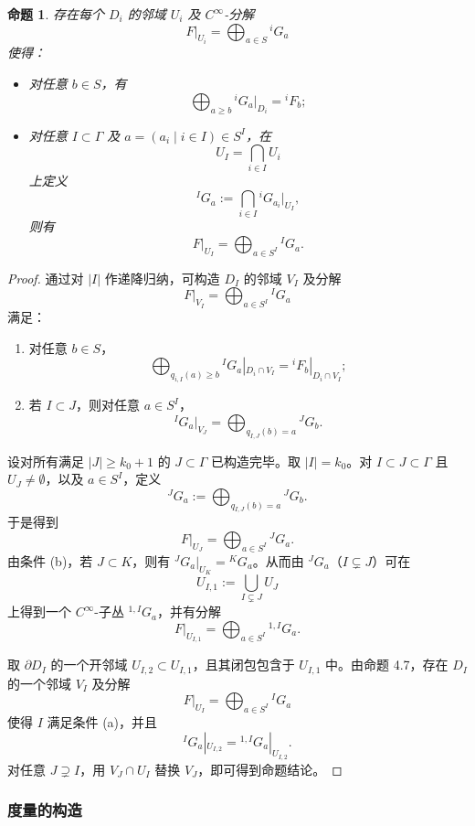 \documentclass[12pt,a4paper]{article}
\newtheorem{proposition}[theorem]{命题}
\begin{document}
\begin{proposition}
存在每个 \(D_i\) 的邻域 \(U_i\) 及 \(C^\infty\)-分解
\[
F|_{U_i}=\bigoplus_{a\in S} {}^iG_a
\]
使得：
\begin{itemize}
\item 对任意 \(b\in S\)，有
\[
\bigoplus_{a\ge b} {}^iG_a|_{D_i}={}^iF_b;
\]
\item 对任意 \(I\subset \Gamma\) 及 \(a=(a_i\mid i\in I)\in S^I\)，在
\[
U_I=\bigcap_{i\in I}U_i
\]
上定义
\[
{}^IG_a:=\bigcap_{i\in I} {}^iG_{a_i}|_{U_I},
\]
则有
\[
F|_{U_I}=\bigoplus_{a\in S^I} {}^IG_a.
\]
\end{itemize}
\end{proposition}

\begin{proof}
通过对 \(|I|\) 作递降归纳，可构造 \(D_I\) 的邻域 \(V_I\) 及分解
\[
F|_{V_I}=\bigoplus_{a\in S^I} {}^IG_a
\]
满足：
\begin{enumerate}[label=(\alph*)]
\item 对任意 \(b\in S\)，
\[
\bigoplus_{q_{i,I}(a)\ge b} {}^IG_a|_{D_i\cap V_I}
=
{}^iF_b|_{D_i\cap V_I};
\]
\item 若 \(I\subset J\)，则对任意 \(a\in S^I\)，
\[
{}^IG_a|_{V_J}
=
\bigoplus_{q_{I,J}(b)=a} {}^JG_b.
\]
\end{enumerate}

设对所有满足 \(|J|\ge k_0+1\) 的 \(J\subset \Gamma\) 已构造完毕。取 \(|I|=k_0\)。对 \(I\subset J\subset \Gamma\) 且 \(U_J\neq\emptyset\)，以及 \(a\in S^I\)，定义
\[
{}^JG_a:=\bigoplus_{q_{I,J}(b)=a} {}^JG_b.
\]
于是得到
\[
F|_{U_J}=\bigoplus_{a\in S^I} {}^JG_a.
\]
由条件 (b)，若 \(J\subset K\)，则有 \({}^JG_a|_{U_K}={}^KG_a\)。从而由 \({}^JG_a\)（\(I\subsetneq J\)）可在
\[
U_{I,1}:=\bigcup_{I\subsetneq J}U_J
\]
上得到一个 \(C^\infty\)-子丛 \({}^{1,I}G_a\)，并有分解
\[
F|_{U_{I,1}}=\bigoplus_{a\in S^I} {}^{1,I}G_a.
\]

取 \(\partial D_I\) 的一个开邻域 \(U_{I,2}\subset U_{I,1}\)，且其闭包包含于 \(U_{I,1}\) 中。由命题 4.7，存在 \(D_I\) 的一个邻域 \(V_I\) 及分解
\[
F|_{U_I}=\bigoplus_{a\in S^I} {}^IG_a
\]
使得 \(I\) 满足条件 (a)，并且
\[
{}^IG_a|_{U_{I,2}}={} ^{1,I}G_a|_{U_{I,2}}.
\]
对任意 \(J\supsetneq I\)，用 \(V_J\cap U_I\) 替换 \(V_J\)，即可得到命题结论。
\end{proof}

\subsubsection{度量的构造}
\end{document}

